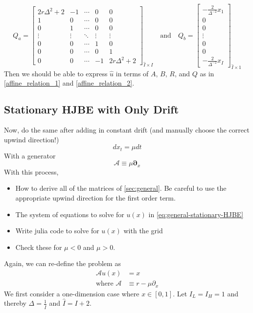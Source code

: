 \documentclass[11pt]{article}
\newcommand{\D}[1][]{\ensuremath{\boldsymbol{\partial}_{#1}}}
\newcommand{\A}{\ensuremath{\mathcal{A}}}
\begin{document}
\begin{equation}
Q_a = \begin{bmatrix}
2r\Delta^2+2&-1&\cdots&0&0\\
1&0&\cdots&0&0\\
0&1&\cdots&0&0\\
\vdots&\vdots&\ddots&\vdots&\vdots\\
0&0&\cdots&1&0\\
0&0&\cdots&0&1\\
0&0&\cdots&-1&2r\Delta^2+2
\end{bmatrix}_{\hat{I}\times I}\quad\text{and}\quad Q_b = \begin{bmatrix}
-\frac{2}{\Delta^{-2}}x_1\\
0\\
0\\
\vdots\\
0\\
0\\
-\frac{2}{\Delta^{-2}}x_{I}
\end{bmatrix}_{\hat{I}\times 1}
\end{equation}
Then we should be able to express $\hat{u}$ in terms of $A$, $B$, $R$, and $Q$ as in \eqref{affine_relation_1} and \eqref{affine_relation_2}.

\subsection{Stationary HJBE with Only Drift}
Now, do the same after adding in constant drift (and manually choose the correct upwind direction!)
$$
d x_t = \mu dt
$$
With a generator
$$
	\A \equiv \mu \D[x]
$$
With this process,
\begin{itemize}
	\item How to derive all of the matrices of \cref{sec:general}.  Be careful to use the appropriate upwind direction for the first order term.
	\item The system of equations to solve for $u(x)$ in \cref{eq:general-stationary-HJBE}
	\item Write julia code to solve for $u(x)$ with the grid
	\item Check these for $\mu < 0$ and $\mu > 0$.
\end{itemize}

Again, we can re-define the problem as 
\begin{align}
\A u(x) &= x\label{HJBE_with_only_drift_PDE}\\
\text{where }\A&\equiv r -\mu\partial_{x}
\end{align}
We first consider a one-dimension case where $x\in [0, 1]$. Let $I_L = I_H = 1$ and thereby $\Delta  = \frac{1}{\bar{I}}$ and $\hat{I} = I+2$. 
\end{document}
